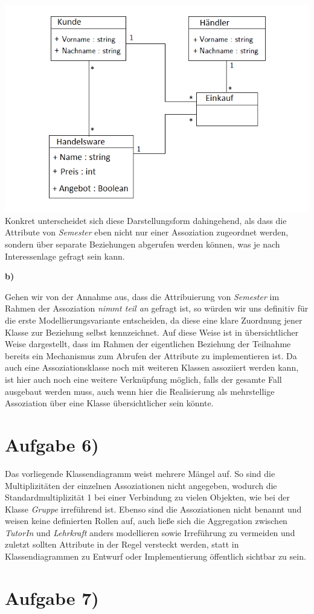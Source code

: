 \documentclass{swp1}
\begin{document}
\newline
\includegraphics[scale=0.5]{Mehrteilige_Assoziation}
\newline
Konkret unterscheidet sich diese Darstellungsform dahingehend, als dass die Attribute von \emph{Semester} eben nicht nur einer Assoziation zugeordnet werden, sondern über separate Beziehungen abgerufen werden können, was je nach Interessenlage gefragt sein kann.\newline

\textbf{b)}\newline

Gehen wir von der Annahme aus, dass die Attribuierung von \emph{Semester} im Rahmen der Assoziation \emph{nimmt teil an} gefragt ist, so würden wir uns definitiv für die erste Modellierungsvariante entscheiden, da diese eine klare Zuordnung jener Klasse zur Beziehung selbst kennzeichnet. Auf diese Weise ist in übersichtlicher Weise dargestellt, dass im Rahmen der eigentlichen Beziehung der Teilnahme bereits ein Mechanismus zum Abrufen der Attribute zu implementieren ist.\newline
Da auch eine Assoziationsklasse noch mit weiteren Klassen assoziiert werden kann, ist hier auch noch eine weitere Verknüpfung möglich, falls der gesamte Fall ausgebaut werden muss, auch wenn hier die Realisierung als mehrstellige Assoziation über eine Klasse übersichtlicher sein könnte.

\section*{Aufgabe 6)}

Das vorliegende Klassendiagramm weist mehrere Mängel auf. So sind die Multiplizitäten der einzelnen Assoziationen nicht angegeben, wodurch die Standardmultiplizität 1 bei einer Verbindung zu vielen Objekten, wie bei der Klasse \emph{Gruppe} irreführend ist. Ebenso sind die Assoziationen nicht benannt und weisen keine definierten Rollen auf, auch ließe sich die Aggregation zwischen \emph{TutorIn} und \emph{Lehrkraft} anders modellieren sowie Irreführung zu vermeiden und zuletzt sollten Attribute in der Regel versteckt werden, statt in Klassendiagrammen zu Entwurf oder Implementierung öffentlich sichtbar zu sein.

\section*{Aufgabe 7)}
\end{document}
